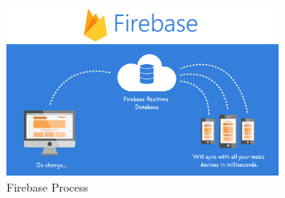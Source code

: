 \newline
\begin{figure}[htp]%
    \center%
    \includegraphics[width=0.8\textwidth]{images/ch4/firebasecon.png}%
    \caption[Firebase Process]{Firebase Process}\label{fig: Firebase  Process}%
  \end{figure}
\newline
















